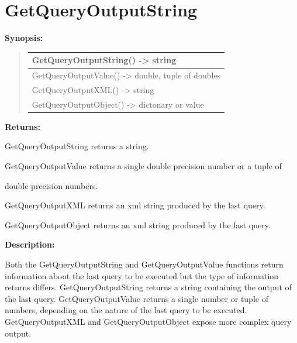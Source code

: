 \documentclass[letterpaper,10pt,english]{sphinxmanual}
\begin{document}
\section{GetQueryOutputString}
\label{functions:getqueryoutputstring}
\begin{DUlineblock}{0em}
\item[] \textbf{Synopsis:}
\end{DUlineblock}
\begin{quote}

\begin{tabulary}{\linewidth}{|L|}
\hline

GetQueryOutputString() -\textgreater{} string
\\
\hline
GetQueryOutputValue() -\textgreater{} double, tuple of doubles
\\
\hline
GetQueryOutputXML() -\textgreater{} string
\\
\hline
GetQueryOutputObject() -\textgreater{} dictonary or value
\\
\hline\end{tabulary}

\end{quote}

\begin{DUlineblock}{0em}
\item[] 
\item[] \textbf{Returns:}
\item[] GetQueryOutputString returns a string.
\item[] GetQueryOutputValue returns a single double precision number or a tuple of
\item[] double precision numbers.
\item[] GetQueryOutputXML returns an xml string produced by the last query.
\item[] GetQueryOutputObject returns an xml string produced by the last query.
\item[] 
\item[] \textbf{Description:}
\item[] Both the GetQueryOutputString and GetQueryOutputValue functions return
information about the last query to be executed but the type of information
returns differs. GetQueryOutputString returns a string containing the
output of the last query. GetQueryOutputValue returns a single number or
tuple of numbers, depending on the nature of the last query to be executed.
GetQueryOutputXML and GetQueryOutputObject expose more complex query output.
\end{DUlineblock}
\end{document}
